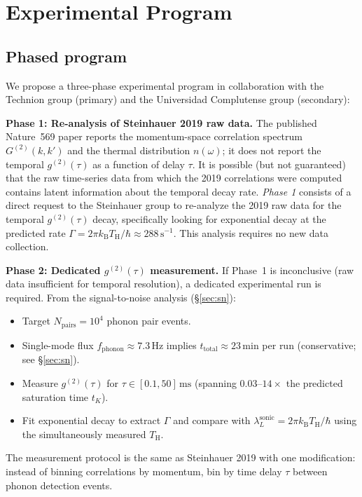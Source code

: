 \documentclass[12pt,a4paper]{article}
\renewcommand{\TH}{T_{\mathrm{H}}}
\newcommand{\lambdaL}{\lambda_L^{\mathrm{sonic}}}
\newcommand{\kB}{k_{\mathrm{B}}}
\begin{document}
\section{Experimental Program}
\label{sec:program}

\subsection{Phased program}

We propose a three-phase experimental program in collaboration with the
Technion group (primary) and the Universidad Complutense group (secondary):

\medskip
\noindent\textbf{Phase 1: Re-analysis of Steinhauer 2019 raw data.}
The published Nature~569 paper \cite{steinhauer2019} reports the
momentum-space correlation spectrum $G^{(2)}(k,k')$ and the thermal
distribution $n(\omega)$; it does not report the temporal $g^{(2)}(\tau)$
as a function of delay $\tau$.
It is possible (but not guaranteed) that the raw time-series data from
which the 2019 correlations were computed contains latent information
about the temporal decay rate.
\emph{Phase 1} consists of a direct request to the Steinhauer group to
re-analyze the 2019 raw data for the temporal $g^{(2)}(\tau)$ decay,
specifically looking for exponential decay at the predicted rate
$\Gamma = 2\pi\kB\TH/\hbar \approx 288\,\mathrm{s}^{-1}$.
This analysis requires no new data collection.

\medskip
\noindent\textbf{Phase 2: Dedicated $g^{(2)}(\tau)$ measurement.}
If Phase~1 is inconclusive (raw data insufficient for temporal resolution),
a dedicated experimental run is required.
From the signal-to-noise analysis (\S\ref{sec:sn}):
\begin{itemize}
  \item Target $N_{\mathrm{pairs}} = 10^4$ phonon pair events.
  \item Single-mode flux $f_{\mathrm{phonon}} \approx 7.3\,\mathrm{Hz}$
    implies $t_{\mathrm{total}} \approx 23\,\mathrm{min}$ per run
    (conservative; see \S\ref{sec:sn}).
  \item Measure $g^{(2)}(\tau)$ for $\tau \in [0.1, 50]\,\mathrm{ms}$
    (spanning $0.03$--$14\times$ the predicted saturation time $t_K$).
  \item Fit exponential decay to extract $\Gamma$ and compare with
    $\lambdaL = 2\pi\kB\TH/\hbar$ using the simultaneously measured $\TH$.
\end{itemize}
The measurement protocol is the same as Steinhauer 2019 with one
modification: instead of binning correlations by momentum, bin by time
delay $\tau$ between phonon detection events.
\end{document}
